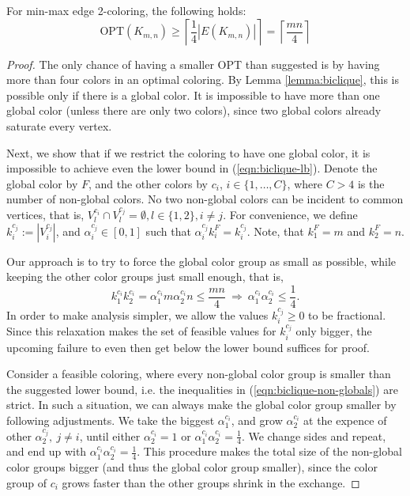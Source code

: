 \documentclass[runningheads, a4paper]{llncs}
\begin{document}
\begin{theorem}\label{theorem:biclique}
For min-max edge 2-coloring, the following holds:
\begin{equation}\label{eqn:biclique-lb}
\textrm{OPT}(K_{m,n}) \geq \left\lceil \frac{1}{4} |E(K_{m,n})| \right\rceil = \left\lceil \frac{mn}{4} \right\rceil
\end{equation}
\end{theorem}
\begin{proof}
The only chance of having a smaller OPT than suggested is by having more than four colors in an optimal coloring. By Lemma \ref{lemma:biclique}, this is possible only if there is a global color. It is impossible to have more than one global color (unless there are only two colors), since two global colors already saturate every vertex.

Next, we show that if we restrict the coloring to have one global color, it is impossible to achieve even the lower bound in (\ref{eqn:biclique-lb}). Denote the global color by $F$, and the other colors by $c_i$, $i \in \{1, \ldots, C\}$,  where $C > 4$ is the number of non-global colors. No two non-global colors can be incident to common vertices, that is, $V_l^{c_i} \cap V_l^{c_j} = \emptyset, l \in \{1,2\}, i \neq j$. For convenience, we define $k_i^{c_j} := |V_i^{c_j}|$, and $\alpha_i^{c_j} \in [0,1]$ such that $\alpha_i^{c_j}k_i^F = k_i^{c_j}$. Note, that $k_1^F = m$ and $k_2^F = n$.

Our approach is to try to force the global color group as small as possible, while keeping the other color groups just small enough, that is,
\begin{equation}\label{eqn:biclique-non-globals}
k_1^{c_i}k_2^{c_i} = \alpha_1^{c_i}m\alpha_2^{c_i}n \leq \frac{mn}{4} \ \Longrightarrow \ \alpha_1^{c_i}\alpha_2^{c_i} \leq \frac{1}{4}.
\end{equation}
In order to make analysis simpler, we allow the values $k_i^{c_j} \geq 0$ to be fractional. Since this relaxation makes the set of feasible values for $k_i^{c_j}$ only bigger, the upcoming failure to even then get below the lower bound suffices for proof.

Consider a feasible coloring, where every non-global color group is smaller than the suggested lower bound, i.e. the inequalities in (\ref{eqn:biclique-non-globals}) are strict. In such a situation, we can always make the global color group smaller by following adjustments. We take the biggest $\alpha_1^{c_i}$, and grow $\alpha_2^{c_i}$ at the expence of other $\alpha_2^{c_j}, \ j \neq i$, until either $\alpha_2^{c_i} = 1$ or $\alpha_1^{c_i}\alpha_2^{c_i} = \frac{1}{4}$. We change sides and repeat, and end up with $\alpha_1^{c_i}\alpha_2^{c_i} = \frac{1}{4}$. This procedure makes the total size of the non-global color groups bigger (and thus the global color group smaller), since the color group of $c_i$ grows faster than the other groups shrink in the exchange.


\end{proof}
\end{document}
